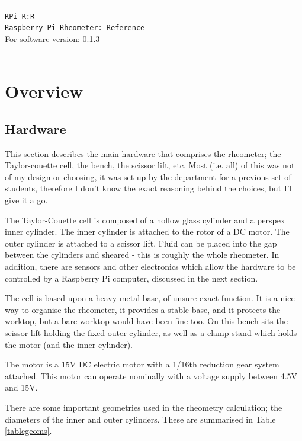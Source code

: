 \documentclass{report}
\begin{document}
	
	{
		\centering
		--\\
		\hline
		\vskip3cm
		\Huge \texttt{RPi-R:R} \\
		\Large \texttt{Raspberry Pi-Rheometer: Reference}\\
		\vskip3cm
		\large For software version: 0.1.3\\
		\vfill
		\hline
		--\\
		\newpage
	}
	
	\tableofcontents
	
	\chapter{Overview}
	
		
		\section{Hardware}
			This section describes the main hardware that comprises the rheometer; the Taylor-couette cell, the bench, the scissor lift, etc. Most (i.e. all) of this was not of my design or choosing, it was set up by the department for a previous set of students, therefore I don't know the exact reasoning behind the choices, but I'll give it a go.
			
			The Taylor-Couette cell is composed of a hollow glass cylinder and a perspex inner cylinder. The inner cylinder is attached to the rotor of a DC motor. The outer cylinder is attached to a scissor lift. Fluid can be placed into the gap between the cylinders and sheared - this is roughly the whole rheometer. In addition, there are sensors and other electronics which allow the hardware to be controlled by a Raspberry Pi computer, discussed in the next section.
			
			The cell is based upon a heavy metal base, of unsure exact function. It is a nice way to organise the rheometer, it provides a stable base, and it protects the worktop, but a bare worktop would have been fine too. On this bench sits the scissor lift holding the fixed outer cylinder, as well as a clamp stand which holds the motor (and the inner cylinder).
			
			The motor is a 15V DC electric motor with a 1/16th reduction gear system attached. This motor can operate nominally with a voltage supply between 4.5V and 15V.
			
			There are some important geometries used in the rheometry calculation; the diameters of the inner and outer cylinders. These are summarised in Table \ref{tablegeoms}.
			
\end{document}
